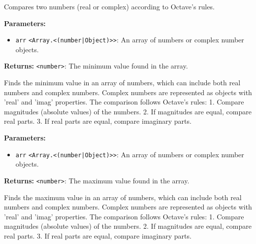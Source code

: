 \documentclass[12pt,a4paper]{article}
\begin{document}
\noindent Compares two numbers (real or complex) according to Octave's rules.

\vspace{5mm}
\noindent {}


\noindent \textbf{Parameters:}
\begin{itemize}
  \item \texttt{arr} \texttt{<Array.<(number|Object)>>}: An array of numbers or complex number objects.
\end{itemize}

\noindent \textbf{Returns:} \texttt{<number>}: The minimum value found in the array.

\noindent Finds the minimum value in an array of numbers, which can include both real numbers and complex numbers.
Complex numbers are represented as objects with 'real' and 'imag' properties.
The comparison follows Octave's rules:
1. Compare magnitudes (absolute values) of the numbers.
2. If magnitudes are equal, compare real parts.
3. If real parts are equal, compare imaginary parts.

\vspace{5mm}
\noindent {}


\noindent \textbf{Parameters:}
\begin{itemize}
  \item \texttt{arr} \texttt{<Array.<(number|Object)>>}: An array of numbers or complex number objects.
\end{itemize}

\noindent \textbf{Returns:} \texttt{<number>}: The maximum value found in the array.

\noindent Finds the maximum value in an array of numbers, which can include both real numbers and complex numbers.
Complex numbers are represented as objects with 'real' and 'imag' properties.
The comparison follows Octave's rules:
1. Compare magnitudes (absolute values) of the numbers.
2. If magnitudes are equal, compare real parts.
3. If real parts are equal, compare imaginary parts.

\vspace{5mm}
\noindent {}
\end{document}
